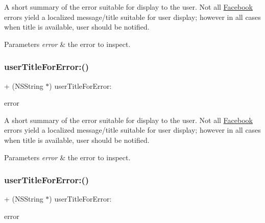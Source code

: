 A short summary of the error suitable for display to the user. Not all \hyperlink{interfaceFacebook}{Facebook} errors yield a localized message/title suitable for user display; however in all cases when title is available, user should be notified.


\begin{DoxyParams}{Parameters}
{\em error} & the error to inspect. \\
\hline
\end{DoxyParams}
\mbox{\label{interfaceFBErrorUtility_a6b294817d5d939cfa12975d994d1dd8b}} 
\subsubsection{\texorpdfstring{user\+Title\+For\+Error\+:()}{userTitleForError:()}\hspace{0.1cm}{\footnotesize\ttfamily [4/5]}}
{\footnotesize\ttfamily + (N\+S\+String $\ast$) user\+Title\+For\+Error\+: \begin{DoxyParamCaption}\item[{(N\+S\+Error $\ast$)}]{error }\end{DoxyParamCaption}}

A short summary of the error suitable for display to the user. Not all \hyperlink{interfaceFacebook}{Facebook} errors yield a localized message/title suitable for user display; however in all cases when title is available, user should be notified.


\begin{DoxyParams}{Parameters}
{\em error} & the error to inspect. \\
\hline
\end{DoxyParams}
\mbox{\label{interfaceFBErrorUtility_a6b294817d5d939cfa12975d994d1dd8b}} 
\subsubsection{\texorpdfstring{user\+Title\+For\+Error\+:()}{userTitleForError:()}\hspace{0.1cm}{\footnotesize\ttfamily [5/5]}}
{\footnotesize\ttfamily + (N\+S\+String $\ast$) user\+Title\+For\+Error\+: \begin{DoxyParamCaption}\item[{(N\+S\+Error $\ast$)}]{error }\end{DoxyParamCaption}}

